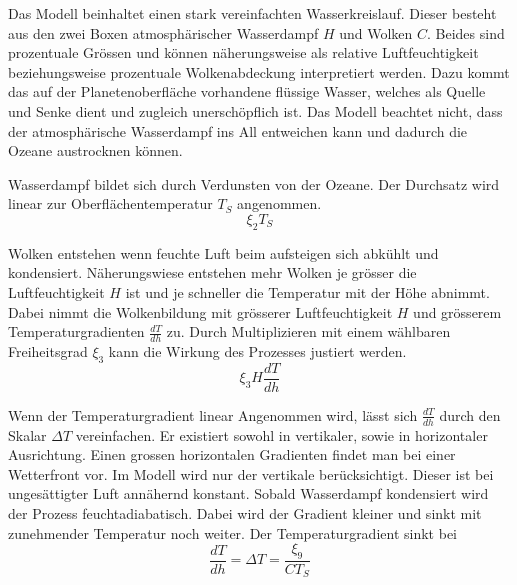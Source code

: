 \begin{refsection}
Das Modell beinhaltet einen stark vereinfachten Wasserkreislauf. Dieser besteht aus den zwei Boxen atmosphärischer Wasserdampf $H$ und Wolken $C$. Beides sind prozentuale Grössen und können näherungsweise als relative Luftfeuchtigkeit beziehungsweise prozentuale Wolkenabdeckung interpretiert werden. Dazu kommt das auf der Planetenoberfläche vorhandene flüssige Wasser, welches als Quelle und Senke dient und zugleich unerschöpflich ist. Das Modell beachtet nicht, dass der atmosphärische Wasserdampf ins All entweichen kann und dadurch die Ozeane austrocknen können.


Wasserdampf bildet sich durch Verdunsten von der Ozeane. Der Durchsatz wird linear zur Oberflächentemperatur $T_S$ angenommen.
\begin{equation}
\xi_2 T_S
\end{equation}


Wolken entstehen wenn feuchte Luft beim aufsteigen sich abkühlt und kondensiert. Näherungswiese entstehen mehr Wolken je grösser die Luftfeuchtigkeit $H$ ist und je schneller die Temperatur mit der Höhe abnimmt.
Dabei nimmt die Wolkenbildung mit grösserer Luftfeuchtigkeit $H$ und grösserem Temperaturgradienten $\frac{dT}{dh}$ zu. Durch Multiplizieren mit einem wählbaren Freiheitsgrad $\xi_3$ kann die Wirkung des Prozesses justiert werden. 
\begin{equation}
\xi_3 H \frac{dT}{dh}
\end{equation}

Wenn der Temperaturgradient linear Angenommen wird, lässt sich $\frac{dT}{dh}$ durch den Skalar $\Delta T $ vereinfachen.
Er existiert sowohl in vertikaler, sowie in horizontaler Ausrichtung. Einen grossen horizontalen Gradienten findet man bei einer Wetterfront vor. Im Modell wird nur der vertikale berücksichtigt. Dieser ist bei ungesättigter Luft annähernd konstant. Sobald Wasserdampf kondensiert wird der Prozess feuchtadiabatisch. Dabei wird der Gradient kleiner und sinkt mit zunehmender Temperatur noch weiter.
Der Temperaturgradient sinkt bei 
\begin{equation}
\frac{dT}{dh} = \Delta T = \frac{\xi_9}{C T_S} 
\end{equation}


\end{refsection}
